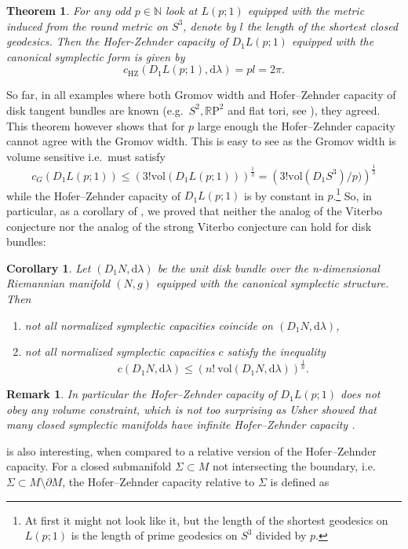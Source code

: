 \documentclass[12pt]{article}
\newtheorem{theorem}[Definition]{Theorem}
\newtheorem{Corollary}[Definition]{Corollary}
\newtheorem{Remark}[Definition]{Remark}
\newcommand{\rp}{\mathbb{R}\mathrm{P}}
\newcommand{\N}{\mathbb{N}} %
\newcommand{\hz}{\mathrm{HZ}}
\newcommand{\dd}{\mathrm{d}}
\begin{document}
\begin{theorem}\label{thm}
  For any odd $p\in\N$ look at $L(p;1)$ equipped with the metric induced from the round metric on $S^3$, denote by $l$ the length of the shortest closed geodesics. Then the Hofer-Zehnder capacity of $D_1L(p;1)$ equipped with the canonical symplectic form is given by
  $$
    c_{\hz}(D_1L(p;1),\dd\lambda)=pl= 2\pi.
  $$
\end{theorem}\noindent
 So far, in all examples where both Gromov width and Hofer--Zehnder capacity of disk tangent bundles are known (e.g.\ $S^2, \rp^2$ and flat tori, see \cite{BBZ23, B23, FR22}), they agreed. This theorem however shows that for $p$ large enough the Hofer--Zehnder capacity cannot agree with the Gromov width. This is easy to see as the Gromov width is volume sensitive i.e.\ must satisfy
   $$
    c_G(D_1L(p;1))\leq \left( 3! \mathrm{vol}(D_1L(p;1))\right)^{\frac{1}{3}}=\left( 3! \mathrm{vol}(D_1S^3)/p)\right)^{\frac{1}{3}}
    $$
    while the Hofer--Zehnder capacity of $D_1L(p;1)$ is by  constant in $p$.\footnote{At first it might not look like it, but the length of the shortest geodesics on $L(p;1)$ is the length of prime geodesics on $S^3$ divided by $p$.} So, in particular, as a corollary of , we proved that neither the analog of the Viterbo conjecture nor the analog of the strong Viterbo conjecture can hold for disk bundles: \begin{Corollary}
        Let $(D_1 N,\dd\lambda)$ be the unit disk bundle over the n-dimensional Riemannian manifold $(N,g)$ equipped with the canonical symplectic structure. Then  \begin{enumerate}
            \item not all normalized symplectic capacities coincide on $(D_1 N,\dd\lambda)$,
            \item not all normalized symplectic capacities $c$ satisfy the inequality \[
            c\left(D_1 N,\dd\lambda \right)\leq \left(n!\ \mathrm{vol}(D_1 N,\dd\lambda) \right)^{\frac{1}{n}}.
            \]
        \end{enumerate}
    \end{Corollary}
\begin{Remark}
In particular the Hofer--Zehnder capacity of $D_1L(p;1)$ does not obey any volume constraint, which is not too surprising as Usher showed that many closed symplectic manifolds have infinite Hofer--Zehnder capacity \cite{U12}. 
\end{Remark}
\noindent
{} is also interesting, when compared to a relative version of the Hofer--Zehnder capacity. For a closed submanifold $\Sigma\subset M$ not intersecting the boundary, i.e.\ $\Sigma\subset M\setminus \partial M$, the Hofer--Zehnder capacity relative to $\Sigma$ is defined as
\end{document}
